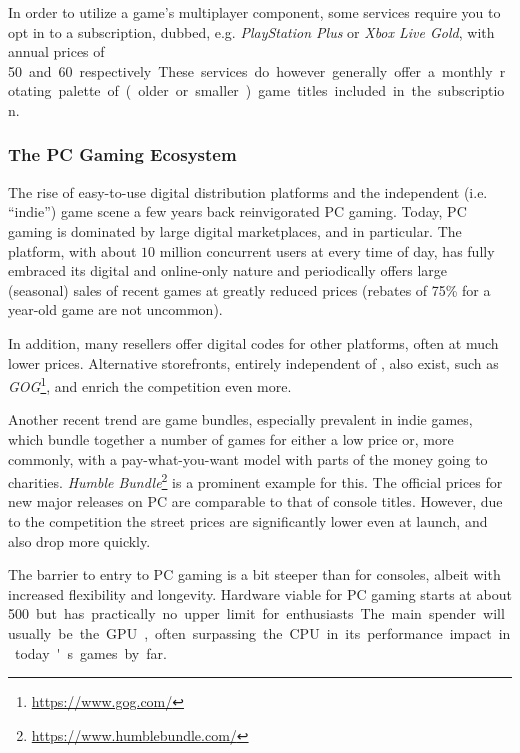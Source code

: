 In order to utilize a game's multiplayer component, some services require you to opt in to a subscription, dubbed, e.g. \textit{PlayStation Plus} or \textit{Xbox Live Gold}, with annual prices of \SI{50}[\EUR] and \SI{60}[\EUR] respectively. These services do however generally offer a monthly rotating palette of (older or smaller) game titles included in the subscription.



\subsubsection{The PC Gaming Ecosystem}
\label{sec:pcgaming}

The rise of easy-to-use digital distribution platforms and the independent (i.e. ``indie'') game scene a few years back reinvigorated PC gaming. Today, PC gaming is dominated by large digital marketplaces, and \steam in particular. The platform, with about $10$ million concurrent users at every time of day, has fully embraced its digital and online-only nature and periodically offers large (seasonal) sales of recent games at greatly reduced prices (rebates of 75\% for a year-old game are not uncommon). 

In addition, many resellers offer digital codes for other platforms, often at much lower prices. Alternative storefronts, entirely independent of \steam, also exist, such as \textit{GOG}\footnote{\url{https://www.gog.com/}}, and enrich the competition even more.

Another recent trend are game bundles, especially prevalent in indie games, which bundle together a number of games for either a low price or, more commonly, with a pay-what-you-want model with parts of the money going to charities. \textit{Humble Bundle}\footnote{\url{https://www.humblebundle.com/}} is a prominent example for this. The official prices for new major releases on PC are comparable to that of console titles. However, due to the competition the street prices are significantly lower even at launch, and also drop more quickly.

The barrier to entry to PC gaming is a bit steeper than for consoles, albeit with increased flexibility and longevity. Hardware viable for PC gaming starts at about \SI{500}[\EUR] but has practically no upper limit for enthusiasts. The main spender will usually be the \gls{GPU}, often surpassing the \acrshort{CPU} in its performance impact in today's games by far.

